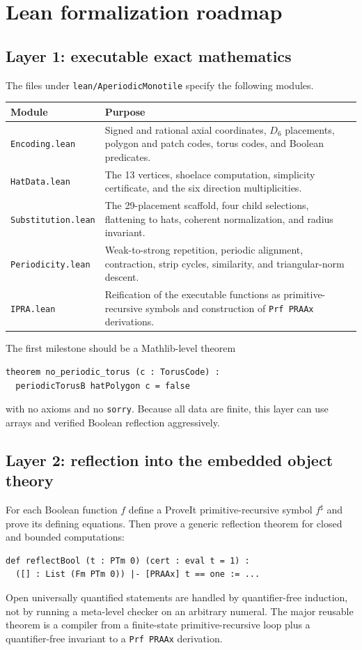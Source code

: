 \documentclass[11pt]{article}
\begin{document}
\section{Lean formalization roadmap}\label{sec:lean}

\subsection{Layer 1: executable exact mathematics}
The files under \texttt{lean/AperiodicMonotile} specify the following modules.

\begin{longtable}{p{}p{}}
\toprule
Module & Purpose\\
\midrule
\endhead
\texttt{Encoding.lean} & Signed and rational axial coordinates, $D_6$ placements,
polygon and patch codes, torus codes, and Boolean predicates.\\
\texttt{HatData.lean} & The 13 vertices, shoelace computation, simplicity certificate,
and the six direction multiplicities.\\
\texttt{Substitution.lean} & The 29-placement scaffold, four child selections, flattening
to hats, coherent normalization, and radius invariant.\\
\texttt{Periodicity.lean} & Weak-to-strong repetition, periodic alignment, contraction,
strip cycles, similarity, and triangular-norm descent.\\
\texttt{IPRA.lean} & Reification of the executable functions as primitive-recursive
symbols and construction of \texttt{Prf PRAAx} derivations.\\
\bottomrule
\end{longtable}

The first milestone should be a Mathlib-level theorem
\begin{lstlisting}
theorem no_periodic_torus (c : TorusCode) :
  periodicTorusB hatPolygon c = false
\end{lstlisting}
with no axioms and no \texttt{sorry}.  Because all data are finite, this layer can use
arrays and verified Boolean reflection aggressively.

\subsection{Layer 2: reflection into the embedded object theory}
For each Boolean function $f$ define a ProveIt primitive-recursive symbol $f^\sharp$ and
prove its defining equations.  Then prove a generic reflection theorem for closed and
bounded computations:
\begin{lstlisting}
def reflectBool (t : PTm 0) (cert : eval t = 1) :
  ([] : List (Fm PTm 0)) |- [PRAAx] t == one := ...
\end{lstlisting}
Open universally quantified statements are handled by quantifier-free induction, not by
running a meta-level checker on an arbitrary numeral.  The major reusable theorem is a
compiler from a finite-state primitive-recursive loop plus a quantifier-free invariant to
a \texttt{Prf PRAAx} derivation.
\end{document}
